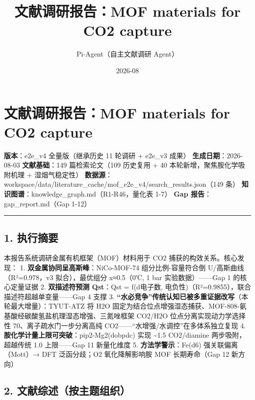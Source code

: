 \documentclass[12pt,a4paper]{ctexart}
\title{ 文献调研报告：MOF materials for CO2 capture }
\date{ 2026-08 }
\author{Pi-Agent（自主文献调研 Agent）}
\begin{document}
\maketitle
\sloppy  %

\section{文献调研报告：MOF materials for CO2 capture}\label{ux6587ux732eux8c03ux7814ux62a5ux544amof-materials-for-co2-capture}

\textbf{版本}：e2e\_v4 全量版（继承历史 11 轮调研 + e2e\_v3 成果） \textbf{生成日期}：2026-08-03 \textbf{文献基础}：149 篇检索论文（109 历史复用 + 40 本轮新增，聚焦胺化学吸附机理 + 湿烟气稳定性） \textbf{数据源}：workspace/data/literature\_cache/mof\_e2e\_v4/search\_results.json（149 条） \textbf{知识图谱}：knowledge\_graph.md（R1-R46，量化表 1-7） \textbf{Gap 报告}：gap\_report.md（Gap 1-12）

\begin{center}\rule{0.5\linewidth}{0.5pt}\end{center}

\subsection{1. 执行摘要}\label{ux6267ux884cux6458ux8981}

本报告系统调研金属有机框架（MOF）材料用于 CO2 捕获的构效关系。核心发现： 1. \textbf{双金属协同呈高斯峰}：NiCo-MOF-74 组分比例-容量符合倒 U/高斯曲线（R²=0.978，v3 拟合），最优组分 x≈0.5（0℃, 1 bar 实验数据）------Gap 1 的核心定量证据 2. \textbf{双描述符预测 Qst}：Qst = f(d电子数, 电负性)（R²=0.9855），联合描述符超越单变量------Gap 4 支撑 3. \textbf{``水必竞争''传统认知已被多重证据改写}（本轮最大增量）：TYUT-ATZ 将 H2O 固定为结合位点增强湿态捕获、MOF-808-氨基酸经碳酸氢盐机理湿态增强、三氮唑框架 CO2/H2O 位点分离实现动力学选择性 70、离子疏水门一步分离高纯 CO2------``水增强/水调控''在多体系独立复现 4. \textbf{胺化学计量上限可突破}：pip2-Mg2(dobpdc) 实现 \textasciitilde1.5 CO2/diamine 两步吸附，超越传统 1.0 上限------Gap 11 新量化维度 5. \textbf{方法学警示}：Fe(d6) 强关联偏离（Mott）→ DFT 泛函分歧；O2 氧化降解影响胺 MOF 长期寿命（Gap 12 新方向）

\subsection{2. 文献综述（按主题组织）}\label{ux6587ux732eux7efcux8ff0ux6309ux4e3bux9898ux7ec4ux7ec7}
\end{document}

